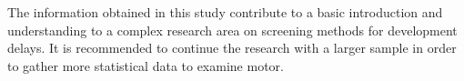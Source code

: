 The information obtained in this study contribute to a basic introduction and understanding to a complex research area on screening methods for development delays. It is recommended to continue the research with a larger sample in order to gather more statistical data to examine motor.  





\hypersetup{pageanchor=false}